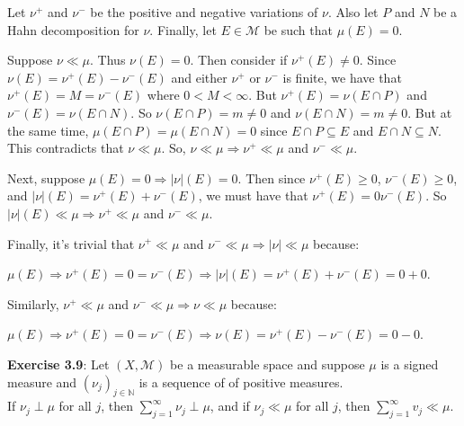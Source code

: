 \documentclass{book}
\newcommand{\exTwoP}{%
   \color{RedViolet}%
   \fontsize{13}{15}\selectfont%
}
\newenvironment{myIndent}{%
   \begin{adjustwidth}{2.5em}{0em}%
}{%
   \end{adjustwidth}%
}
\newcommand{\blab}[1]{\textbf{#1}}
\newcommand{\retTwo}{\hfill\bigbreak}
\begin{document}
\begin{myIndent}\exTwoP
	Let $\nu^+$ and $\nu^-$ be the positive and negative variations of $\nu$. Also let $P$ and $N$ be a Hahn decomposition for $\nu$. Finally, let $E \in \mathcal{M}$ be such that $\mu(E) = 0$.\retTwo

	Suppose $\nu \ll \mu$. Thus $\nu(E) = 0$. Then consider if $\nu^+(E) \neq 0$. Since\\ $\nu(E) = \nu^+(E) - \nu^-(E)$ and either $\nu^+$ or $\nu^-$ is finite, we have that\\ $\nu^+(E) = M = \nu^-(E)$ where $0 < M < \infty$. But $\nu^+(E) = \nu(E \cap P)$ and\\ $\nu^-(E) = \nu(E \cap N)$. So $\nu(E \cap P) = m \neq 0$ and $\nu(E \cap N) = m \neq 0$. But at the same time, $\mu(E \cap P) = \mu(E \cap N) = 0$ since $E \cap P \subseteq E$ and $E \cap N \subseteq N$. This contradicts that $\nu \ll \mu$. So, $\nu \ll \mu \Longrightarrow \nu^+ \ll \mu$ and $\nu^- \ll \mu$.\retTwo

	Next, suppose $\mu(E) = 0 \Longrightarrow |\nu|(E) = 0$. Then since $\nu^+(E) \geq 0$, $\nu^-(E) \geq 0$,\\ and $|\nu|(E) = \nu^+(E) + \nu^-(E)$, we must have that $\nu^+(E) = 0 \nu^-(E)$. So\\ $|\nu|(E) \ll \mu \Longrightarrow \nu^+ \ll \mu$ and $\nu^- \ll \mu$.\retTwo

	Finally, it's trivial that $\nu^+ \ll \mu$ and $\nu^- \ll \mu \Longrightarrow |\nu| \ll \mu$ because:
	
	{\centering $\mu(E) \Longrightarrow \nu^+(E) = 0 = \nu^-(E) \Longrightarrow |\nu|(E) = \nu^+(E) + \nu^-(E) = 0 + 0$.\retTwo\par}

	Similarly, $\nu^+ \ll \mu$ and $\nu^- \ll \mu \Longrightarrow \nu \ll \mu$ because:

	{\centering $\mu(E) \Longrightarrow \nu^+(E) = 0 = \nu^-(E) \Longrightarrow \nu(E) = \nu^+(E) - \nu^-(E) = 0 - 0$.\retTwo\par}
\end{myIndent}

\blab{Exercise 3.9}: Let $(X, \mathcal{M})$ be a measurable space and suppose $\mu$ is a signed measure and $(\nu_j)_{j \in \mathbb{N}}$ is a sequence of of positive measures.\\ [2pt] If $\nu_j \perp \mu$ for all $j$, then $\sum\limits_{j=1}^\infty \nu_j \perp \mu$, and if $\nu_j \ll \mu$ for all $j$, then $\sum\limits_{j=1}^\infty v_j \ll \mu$.\\ [2pt]
\end{document}
